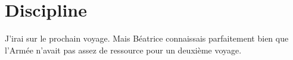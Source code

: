\chapter{Discipline}





J'irai sur le prochain voyage. Mais Béatrice connaissais parfaitement bien que l'Armée n'avait pas assez de ressource pour un deuxième voyage.
